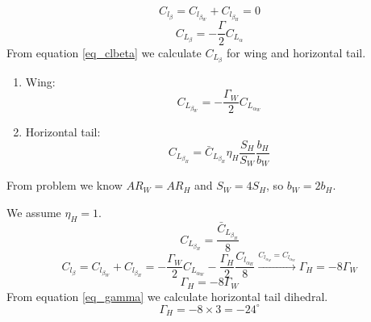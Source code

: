 $$C_{l_\beta} = C_{l_{\beta_W}} + C_{l_{\beta_H}} = 0$$
\begin{equation}
	C_{L_\beta} = -\dfrac{\Gamma}{2}C_{L_\alpha}
	\label{eq_clbeta}
\end{equation}
From equation \ref{eq_clbeta} we calculate $C_{L_\beta}$ for wing and horizontal tail.
\begin{enumerate}
	\item Wing:
	$$C_{L_{\beta_W}} = -\dfrac{\Gamma_W}{2}C_{L_{\alpha_W}}$$
	\item Horizontal tail:
	$$C_{L_{\beta_H}} = \bar C_{L_{\beta_H}} \eta_H \dfrac{S_H}{S_W}\dfrac{b_H}{b_W}$$
\end{enumerate}
From problem we know $AR_W = AR_H$ and $S_W = 4S_H$, so $b_W = 2b_H$.


We assume $\eta_H = 1$.
$$C_{L_{\beta_H}} = \dfrac{\bar C_{L_{\beta_H}}}{8}$$
$$
C_{l_\beta} = C_{l_{\beta_W}} + C_{l_{\beta_H}} = -\dfrac{\Gamma_W}{2}C_{L_{\alpha_W}} 
 -\dfrac{\Gamma_H}{2}\dfrac{C_{l_{\alpha_H}}}{8}  \xrightarrow{C_{l_{\alpha_H}} = C_{l_{\alpha_W}}} \Gamma_H = -8\Gamma_W
$$
\begin{equation}
	\Gamma_H = -8\Gamma_W
	\label{eq_gamma}
\end{equation}
From equation \ref{eq_gamma} we calculate horizontal tail dihedral.
$$\Gamma_H = -8 \times 3 = -24^{\circ}$$
